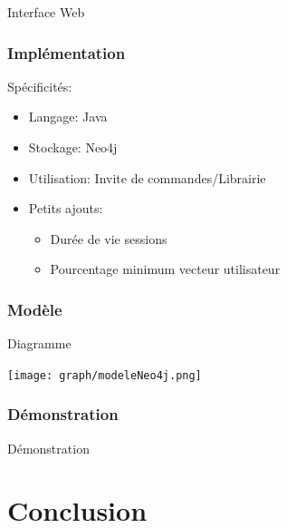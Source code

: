 \documentclass{beamer}
\begin{document}
\begin{frame}
{\begin{exampleblock}{Interface Web}
\begin{center}
                        \end{center}
                    \end{exampleblock}
                }
            \end{frame}
            \begin{frame}
                \frametitle{Implémentation}
                Spécificités:
                \begin{itemize}
                    \pause
                \item Langage: \pause Java
                    \pause
                    \item Stockage: \pause Neo4j
                    \pause
                    \item Utilisation: \pause Invite de commandes/Librairie 
                    \pause
                    \item Petits ajouts:
                    \pause
                        \begin{itemize}
                            \item Durée de vie sessions
                            \pause
                            \item Pourcentage minimum vecteur utilisateur
                        \end{itemize}
                \end{itemize}
                \pause
            \end{frame}
            \begin{frame}
                \frametitle{Modèle}
                \begin{block}{Diagramme}
                    \begin{center}
                        \texttt{[image: graph/modeleNeo4j.png]}
                    \end{center}
                \end{block}
            \end{frame}
            \begin{frame}
                \frametitle{Démonstration}
                \begin{center}
                    Démonstration
                \end{center}
            \end{frame}

    \section{Conclusion}
        \begin{frame}
        \end{frame}
\end{document}
